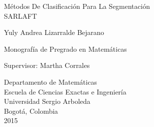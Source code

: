 \begin{titlepage}

  \begin{center}

    {\LARGE M\'etodos De Clasificaci\'on Para La Segmentaci\'on \\ SARLAFT}

    \vspace*{\fill}

    {\large Yuly Andrea Lizarralde Bejarano}

    \vspace*{\fill}

    {\large Monografía de Pregrado en Matemáticas}

    \vspace*{\fill}

    {\large Supervisor:}
    {\large Martha Corrales}

    \vspace*{\fill}

    {\large Departamento de Matemáticas}\\
    {\large Escuela de Ciencias Exactas e Ingeniería}\\
    {\large Universidad Sergio Arboleda}\\
    {\large Bogotá, Colombia}\\
    {\large 2015}

  \end{center}

\end{titlepage}

\clearemptydoublepage
